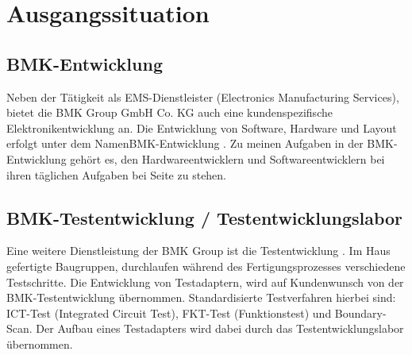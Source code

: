 \documentclass[a4paper,11pt]{scrartcl}
\begin{document}
\section{Ausgangssituation}


\subsection{BMK-Entwicklung}
Neben der Tätigkeit als EMS-Dienstleister (Electronics Manufacturing Services), bietet die \glqq BMK Group GmbH  Co. KG \grqq{} auch eine kundenspezifische Elektronikentwicklung an. Die Entwicklung von Software, Hardware und Layout erfolgt unter dem Namen\glqq BMK-Entwicklung \grqq{} . 
Zu meinen Aufgaben in der BMK-Entwicklung gehört es, den Hardwareentwicklern und Softwareentwicklern bei ihren täglichen Aufgaben bei Seite zu stehen. 


\subsection{BMK-Testentwicklung / Testentwicklungslabor}
Eine weitere Dienstleistung der \glqq BMK Group \grqq{} ist die \glqq Testentwicklung \grqq{}. Im Haus gefertigte Baugruppen, durchlaufen während des Fertigungsprozesses verschiedene Testschritte. Die Entwicklung von Testadaptern, wird auf Kundenwunsch von der BMK-Testentwicklung übernommen. Standardisierte Testverfahren hierbei sind: ICT-Test (Integrated Circuit Test), FKT-Test (Funktionstest) und Boundary-Scan. Der Aufbau eines Testadapters wird dabei durch das Testentwicklungslabor übernommen. 

\end{document}
